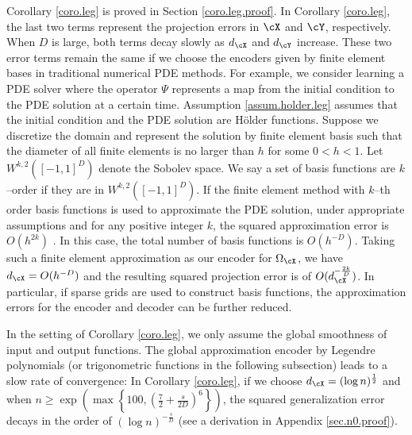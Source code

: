\documentclass[11pt]{article} %
\begin{document}
Corollary \ref{coro.leg} is proved in Section \ref{coro.leg.proof}.
%
 In Corollary \ref{coro.leg}, the last two terms represent the projection errors in $\cX$ and $\cY$, respectively. 
When $D$ is large, both terms decay slowly as $d_{\cX}$ and $d_{\cY}$ increase. These two error terms remain the same if we choose the encoders given by finite element bases in traditional numerical PDE methods.  %
For example, we consider learning a PDE solver where the operator $\Psi$ represents a map from the initial condition to the PDE solution at a certain time. Assumption \ref{assum.holder.leg} assumes that the initial condition and the PDE solution are H\"older functions.  Suppose we discretize the domain and represent the solution by finite element basis such that the diameter of all finite elements is no larger than $h$ for some $0<h<1$. Let $W^{k,2}([-1,1]^D)$ denote the Sobolev space. We say a set of basis functions are $k$--order if they are in $W^{k,2}([-1,1]^D)$. If the finite element method with $k$--th order basis functions is used to approximate the PDE solution, under appropriate assumptions and for any positive integer $k$, the squared approximation error is $O(h^{2k})$ \citep[Corollary 1.109]{ern2004theory}.
In this case, the total number of basis functions is $O(h^{-D})$. Taking such a finite element approximation as our encoder for $\Omega_{\cX}$, we have $d_{\cX}=O(h^{-D})$ and the resulting squared projection error is of $O(d_{\cX}^{-\frac{2k}{D}} )$. In particular, if sparse grids \citep{bungartz2004sparse} are used to construct basis functions, the approximation errors for the encoder and decoder can be further reduced. %





In the setting of Corollary \ref{coro.leg}, we only assume the global smoothness of input and output functions. The global approximation encoder by Legendre polynomials (or trigonometric functions in the following subsection) leads to a slow rate of convergence: In Corollary \ref{coro.leg}, if we choose $d_{\cX}=(\log n)^{\frac{1}{2}}$ and when $n\geq \exp\left(\max\left\{100,\left(\frac{7}{2}+\frac{s}{2D}\right)^{6}\right\}\right)$, the squared generalization error decays in the order of $(\log n)^{-\frac{s}{D}}$ (see a derivation in Appendix \ref{sec.n0.proof}). %
\end{document}
